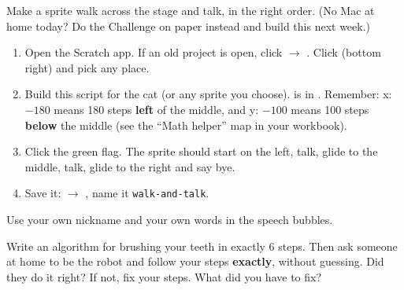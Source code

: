 \namedateline

\begin{core}
Make a sprite walk across the stage and talk, in the right order. (No Mac at home today? Do the Challenge on paper instead and build this next week.)
\begin{enumerate}[leftmargin=1.4em,itemsep=1pt]
  \item Open the Scratch app. If an old project is open, click  $\rightarrow$ . Click  (bottom right) and pick any place.
  \item Build this script for the cat (or any sprite you choose).  is in . Remember: x: $-180$ means 180 steps \textbf{left} of the middle, and y: $-100$ means 100 steps \textbf{below} the middle (see the \enquote{Math helper} map in your workbook).
  \item Click the green flag. The sprite should start on the left, talk, glide to the middle, talk, glide to the right and say bye.
  \item Save it:  $\rightarrow$ , name it \texttt{walk-and-talk}.
\end{enumerate}
\begin{center}
\begin{scratch}[scale=0.85]
\end{scratch}
\end{center}
Use your own nickname and your own words in the speech bubbles.
\end{core}

\begin{challenge}
Write an algorithm for brushing your teeth in exactly 6 steps. Then ask someone at home to be the robot and follow your steps \textbf{exactly}, without guessing. Did they do it right? If not, fix your steps.
What did you have to fix? 
\end{challenge}

